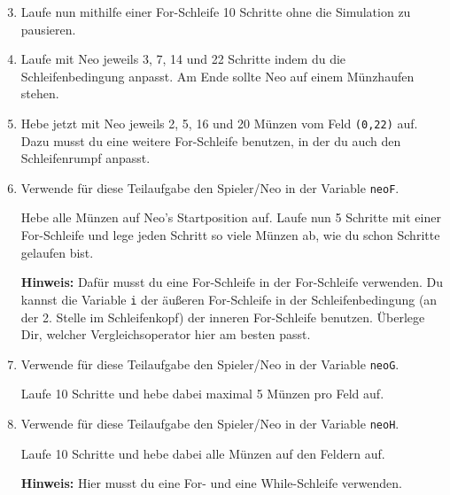 \begin{enumerate}\setcounter{enumi}{2}
	\item
		Laufe nun mithilfe einer For-Schleife 10 Schritte ohne die Simulation zu pausieren.

	\item
		Laufe mit Neo jeweils 3, 7, 14 und 22 Schritte indem du die Schleifenbedingung anpasst.
		Am Ende sollte Neo auf einem Münzhaufen stehen.

	\item
		Hebe jetzt mit Neo jeweils 2, 5, 16 und 20 Münzen vom Feld \texttt{(0,22)} auf.
		Dazu musst du eine weitere For-Schleife benutzen, in der du auch den Schleifenrumpf anpasst.

	\item
		Verwende für diese Teilaufgabe den Spieler/Neo in der Variable \lstinline{neoF}.

		Hebe alle Münzen auf Neo's Startposition auf.
		Laufe nun 5 Schritte mit einer For-Schleife und lege jeden Schritt so viele Münzen ab, wie du schon Schritte gelaufen bist.

		\textbf{Hinweis:} Dafür musst du eine For-Schleife in der For-Schleife verwenden.
		Du kannst die Variable \lstinline{i} der äußeren For-Schleife in der Schleifenbedingung (an der 2. Stelle im Schleifenkopf) der inneren For-Schleife benutzen.
		Überlege Dir, welcher Vergleichsoperator hier am besten passt.

	\item
		Verwende für diese Teilaufgabe den Spieler/Neo in der Variable \lstinline{neoG}.

		Laufe 10 Schritte und hebe dabei maximal 5 Münzen pro Feld auf.

	\item
		Verwende für diese Teilaufgabe den Spieler/Neo in der Variable \lstinline{neoH}.

		Laufe 10 Schritte und hebe dabei alle Münzen auf den Feldern auf.

		\textbf{Hinweis:} Hier musst du eine For- und eine While-Schleife verwenden.
\end{enumerate}
\newpage
